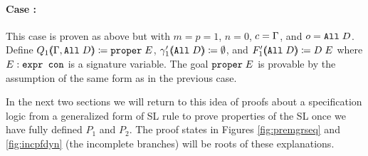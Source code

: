 \paragraph{Case \rlnmball{} :} This case is proven as above but with $m = p = 1$, $n = 0$, $c = \Gamma{}$, and $o = \texttt{All} \; D$. Define $Q_1 (\hspace{-0.35em} \langle \Gamma{} , \texttt{All} \; D \rangle \hspace{-0.35em}) \coloneqq \texttt{proper} \; E$, $\gamma'_1 (\hspace{-0.35em} \langle \texttt{All} \; D \rangle \hspace{-0.35em}) \coloneqq \emptyset$, and $F'_1 (\hspace{-0.35em} \langle \texttt{All} \; D \rangle \hspace{-0.35em}) \coloneqq D \; E$ where $E : \texttt{expr con}$ is a signature variable. The goal $\texttt{proper} \; E$ is provable by the assumption of the same form
as in the previous case.

In the next two sections we will return to this idea of proofs about a specification logic from a generalized form of SL rule to prove properties of the SL once we have fully defined $P_1$ and $P_2$. The proof states in Figures \ref{fig:premgrseq} and \ref{fig:incpfdyn} (the incomplete branches) will be roots of these explanations.
